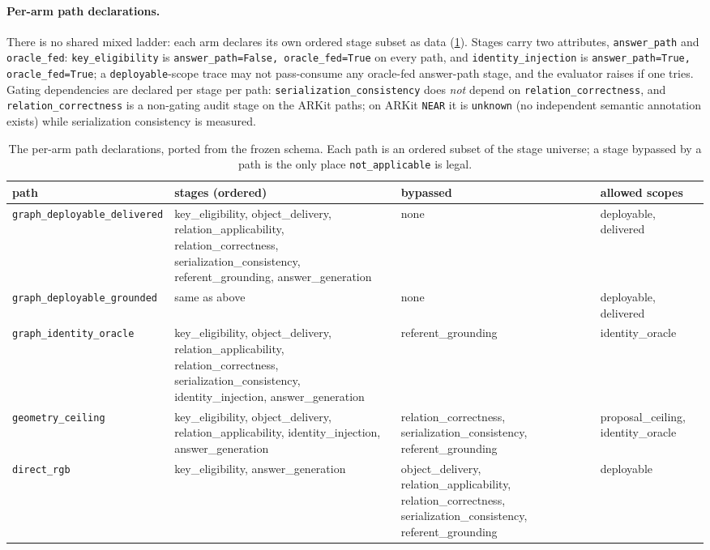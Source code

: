 \paragraph{Per-arm path declarations.} There is no shared mixed ladder:
each arm declares its own ordered stage subset as data
(\cref{tab:paths}). Stages carry two attributes, \texttt{answer\_path} and
\texttt{oracle\_fed}: \texttt{key\_eligibility} is
\texttt{answer\_path=False, oracle\_fed=True} on every path, and
\texttt{identity\_injection} is \texttt{answer\_path=True,
oracle\_fed=True}; a \texttt{deployable}-scope trace may not
pass-consume any oracle-fed answer-path stage, and the evaluator raises if
one tries. Gating dependencies are declared per stage per path:
\texttt{serialization\_consistency} does \emph{not} depend on
\texttt{relation\_correctness}, and \texttt{relation\_correctness} is a
non-gating audit stage on the ARKit paths; on ARKit \texttt{NEAR} it is
\texttt{unknown} (no independent semantic annotation exists) while
serialization consistency is measured.

\begin{table}[t]
  \centering\footnotesize
  \setlength{\tabcolsep}{4pt}
   
  \begin{tabular}{@{}l>{\raggedright\arraybackslash}p{}>{\raggedright\arraybackslash}p{}>{\raggedright\arraybackslash}p{}@{}}
    \toprule
    path & stages (ordered) & bypassed & allowed scopes\\
    \midrule
    \texttt{graph\_deployable\_delivered} &
      key\_eligibility, object\_delivery, relation\_applicability,
      relation\_correctness, serialization\_consistency,
      referent\_grounding, answer\_generation &
      none & deployable, delivered\\
    \addlinespace
    \texttt{graph\_deployable\_grounded} &
      same as above & none & deployable, delivered\\
    \addlinespace
    \texttt{graph\_identity\_oracle} &
      key\_eligibility, object\_delivery, relation\_applicability,
      relation\_correctness, serialization\_consistency,
      identity\_injection, answer\_generation &
      referent\_grounding & identity\_oracle\\
    \addlinespace
    \texttt{geometry\_ceiling} &
      key\_eligibility, object\_delivery, relation\_applicability,
      identity\_injection, answer\_generation &
      relation\_correctness, serialization\_consistency,
      referent\_grounding &
      proposal\_ceiling, identity\_oracle\\
    \addlinespace
    \texttt{direct\_rgb} &
      key\_eligibility, answer\_generation &
      object\_delivery, relation\_applicability, relation\_correctness,
      serialization\_consistency, referent\_grounding &
      deployable\\
    \bottomrule
  \end{tabular}
  \caption{The per-arm path declarations, ported from the frozen schema.
  Each path is an ordered subset of the stage universe; a stage bypassed by
  a path is the only place \texttt{not\_applicable} is legal.}
  \label{tab:paths}
\end{table}
